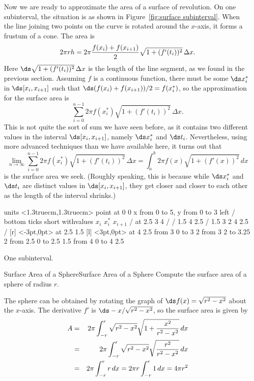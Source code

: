 Now we are ready to approximate the area of a surface of
revolution. On one subinterval, the situation is as shown in
Figure~\ref{fig:surface subinterval}. When the line joining two
points on the curve is rotated around the $x$-axis, it forms a frustum
of a cone. The area is
$$
  2\pi r h= 2\pi {f(x_i)+f(x_{i+1})\over2}
    \sqrt{1+(f'(t_i))^2}\,\Delta x.
$$
Here
$\ds \sqrt{1+(f'(t_i))^2}\,\Delta x$ is the length of the line segment, 
as we found in the previous section. Assuming $f$ is a continuous
function, there must be some $\ds x_i^*$ in $\ds [x_i,x_{i+1}]$
such that
$\ds (f(x_i)+f(x_{i+1}))/2 = f(x_i^*)$, so
the approximation for the
surface area is
$$\sum_{i=0}^{n-1} 2\pi f(x_i^*)\sqrt{1+(f'(t_i))^2}\,\Delta x.$$
This is not quite the sort of sum we have seen before, as it contains
two different values in the interval $\ds [x_i,x_{i+1}]$, namely
$\ds x_i^*$ and $\ds t_i$. Nevertheless, using more advanced techniques
than we have available here, it turns out that
$$\lim_{n\to\infty} 
\sum_{i=0}^{n-1} 2\pi f(x_i^*)\sqrt{1+(f'(t_i))^2}\,\Delta x=
\int_a^b 2\pi f(x)\sqrt{1+(f'(x))^2}\,dx$$ 
is the surface area we seek. (Roughly speaking, this is because while
$\ds x_i^*$ and $\ds t_i$ are distinct values in $\ds[x_i,x_{i+1}]$,
they get closer and closer to each other as the length of the interval
shrinks.) 

\figure[H]
\centerline{\vbox{\beginpicture
\normalgraphs
\setcoordinatesystem units <1.3truecm,1.3truecm> point at 0 0
\setplotarea x from 0 to 5, y from 0 to 3
\axis left /
\axis bottom ticks short withvalues {$x_i$}
  {$x_i^*$} {$x_{i+1}$} / at 2.5 3 4 / /
 1.5 4 2.5 /
\setquadratic
{} 1.5 3 2 4 2.5 /
 [r] <-3pt,0pt> at 2.5 1.5
 [l] <3pt,0pt> at 4 2.5
\setdashes <2pt>
\putrule from 3 0 to 3 2
\putrule from 3 2 to 3.25 2
\setdashes
\putrule from 2.5 0 to 2.5 1.5
\putrule from 4 0 to 4 2.5
\endpicture}}
\caption{\label{fig:surface subinterval}
One subinterval.}
\endfigure

\begin{example}{Surface Area of a Sphere}{Surface Area of a Sphere}\label{Surface Area of a Sphere}
Compute the surface area of a sphere of radius $r$.
\end{example}

\begin{solution}
The sphere can be obtained by rotating the graph of
  $\ds f(x)=\sqrt{r^2 - x^2}$ about the $x$-axis.
The derivative $f'$ is $\ds -x/\sqrt{r^2-x^2}$, so the surface area is
given by
\begin{eqnarray*}
A&=&2\pi \int_{-r }^r \sqrt{r^2 - x^2}\sqrt{1+{x^2\over r^2-x^2}}\,dx\cr
&=&2\pi \int_{-r }^r \sqrt{r^2 - x^2}\sqrt{r^2\over r^2-x^2}\,dx\cr
&=&2\pi \int_{-r }^r r\,dx=2\pi r\int_{-r }^r 1\,dx=4\pi r^2
\end{eqnarray*}\vskip-10pt
\end{solution}

